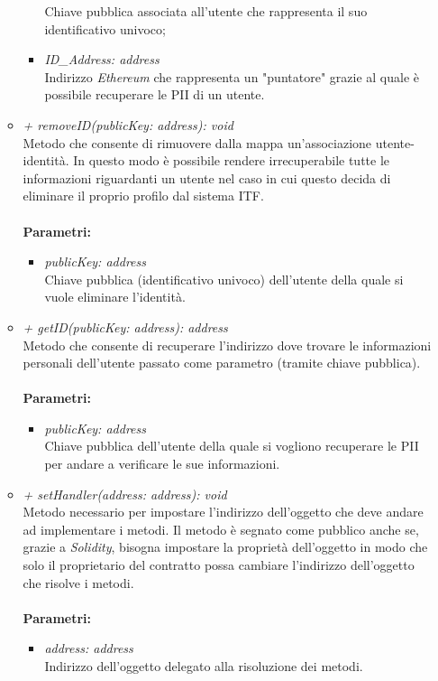 \begin{itemize}
\begin{itemize}
\begin{itemize}
			Chiave pubblica associata all'utente che rappresenta il suo identificativo univoco;
			\item \textit{ID\_Address: address}\\
			Indirizzo \textit{Ethereum} che rappresenta un "puntatore" grazie al quale è possibile recuperare le \gls{PII} di un utente.
		\end{itemize}
		\item \textit{+ removeID(publicKey: address): void}\\
		Metodo che consente di rimuovere dalla mappa un'associazione utente-identità. In questo modo è possibile rendere irrecuperabile tutte le informazioni riguardanti un utente nel caso in cui questo decida di eliminare il proprio profilo dal sistema \gls{ITF}.\\\\
		\textbf{Parametri:}
		\begin{itemize}
			\item \textit{publicKey: address}\\
			Chiave pubblica (identificativo univoco) dell'utente della quale si vuole eliminare l'identità.
		\end{itemize}
		\item \textit{+ getID(publicKey: address): address}\\
		Metodo che consente di recuperare l'indirizzo dove trovare le informazioni personali dell'utente passato come parametro (tramite chiave pubblica).\\\\
		\textbf{Parametri:}
		\begin{itemize}
			\item \textit{publicKey: address}\\
			Chiave pubblica dell'utente della quale si vogliono recuperare le \gls{PII} per andare a verificare le sue informazioni.
		\end{itemize}
		\item \textit{+ setHandler(address: address): void}\\
		Metodo necessario per impostare l'indirizzo dell'oggetto che deve andare ad implementare i metodi. Il metodo è segnato come pubblico anche se, grazie a \textit{Solidity}, bisogna impostare la proprietà dell'oggetto in modo che solo il proprietario del contratto possa cambiare l'indirizzo dell'oggetto che risolve i metodi.\\\\
		\textbf{Parametri:}
		\begin{itemize}
			\item \textit{address: address}\\
			Indirizzo dell'oggetto delegato alla risoluzione dei metodi.
		\end{itemize}
	\end{itemize}
\end{itemize}
\newpage
